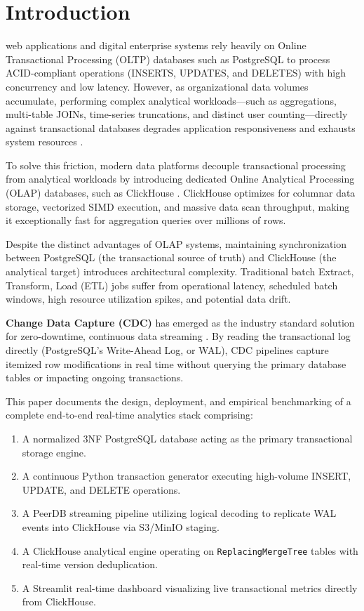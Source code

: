 \documentclass[peerreviewca]{IEEEtran}
\begin{document}
\section{Introduction}
 web applications and digital enterprise systems rely heavily on Online Transactional Processing (OLTP) databases such as PostgreSQL to process ACID-compliant operations (INSERTS, UPDATES, and DELETES) with high concurrency and low latency. However, as organizational data volumes accumulate, performing complex analytical workloads---such as aggregations, multi-table JOINs, time-series truncations, and distinct user counting---directly against transactional databases degrades application responsiveness and exhausts system resources \cite{stonebraker2005}.

To solve this friction, modern data platforms decouple transactional processing from analytical workloads by introducing dedicated Online Analytical Processing (OLAP) databases, such as ClickHouse \cite{clickhouse2024}. ClickHouse optimizes for columnar data storage, vectorized SIMD execution, and massive data scan throughput, making it exceptionally fast for aggregation queries over millions of rows.

Despite the distinct advantages of OLAP systems, maintaining synchronization between PostgreSQL (the transactional source of truth) and ClickHouse (the analytical target) introduces architectural complexity. Traditional batch Extract, Transform, Load (ETL) jobs suffer from operational latency, scheduled batch windows, high resource utilization spikes, and potential data drift.

\textbf{Change Data Capture (CDC)} has emerged as the industry standard solution for zero-downtime, continuous data streaming \cite{kleppmann2017}. By reading the transactional log directly (PostgreSQL's Write-Ahead Log, or WAL), CDC pipelines capture itemized row modifications in real time without querying the primary database tables or impacting ongoing transactions.

This paper documents the design, deployment, and empirical benchmarking of a complete end-to-end real-time analytics stack comprising:
\begin{enumerate}
    \item A normalized 3NF PostgreSQL database acting as the primary transactional storage engine.
    \item A continuous Python transaction generator executing high-volume INSERT, UPDATE, and DELETE operations.
    \item A PeerDB streaming pipeline utilizing logical decoding to replicate WAL events into ClickHouse via S3/MinIO staging.
    \item A ClickHouse analytical engine operating on \texttt{ReplacingMergeTree} tables with real-time version deduplication.
    \item A Streamlit real-time dashboard visualizing live transactional metrics directly from ClickHouse.
\end{enumerate}
\end{document}
